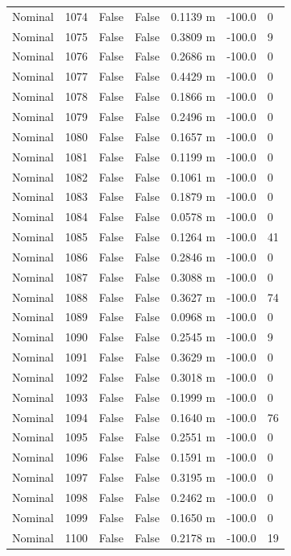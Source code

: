 \documentclass[11pt,a4paper,oneside]{book}
\begin{document}
\begin{longtable}{l l l l l l l}
Nominal & 1074 & False & False & 0.1139 m & -100.0 & 0 \\
Nominal & 1075 & False & False & 0.3809 m & -100.0 & 9 \\
Nominal & 1076 & False & False & 0.2686 m & -100.0 & 0 \\
Nominal & 1077 & False & False & 0.4429 m & -100.0 & 0 \\
Nominal & 1078 & False & False & 0.1866 m & -100.0 & 0 \\
Nominal & 1079 & False & False & 0.2496 m & -100.0 & 0 \\
Nominal & 1080 & False & False & 0.1657 m & -100.0 & 0 \\
Nominal & 1081 & False & False & 0.1199 m & -100.0 & 0 \\
Nominal & 1082 & False & False & 0.1061 m & -100.0 & 0 \\
Nominal & 1083 & False & False & 0.1879 m & -100.0 & 0 \\
Nominal & 1084 & False & False & 0.0578 m & -100.0 & 0 \\
Nominal & 1085 & False & False & 0.1264 m & -100.0 & 41 \\
Nominal & 1086 & False & False & 0.2846 m & -100.0 & 0 \\
Nominal & 1087 & False & False & 0.3088 m & -100.0 & 0 \\
Nominal & 1088 & False & False & 0.3627 m & -100.0 & 74 \\
Nominal & 1089 & False & False & 0.0968 m & -100.0 & 0 \\
Nominal & 1090 & False & False & 0.2545 m & -100.0 & 9 \\
Nominal & 1091 & False & False & 0.3629 m & -100.0 & 0 \\
Nominal & 1092 & False & False & 0.3018 m & -100.0 & 0 \\
Nominal & 1093 & False & False & 0.1999 m & -100.0 & 0 \\
Nominal & 1094 & False & False & 0.1640 m & -100.0 & 76 \\
Nominal & 1095 & False & False & 0.2551 m & -100.0 & 0 \\
Nominal & 1096 & False & False & 0.1591 m & -100.0 & 0 \\
Nominal & 1097 & False & False & 0.3195 m & -100.0 & 0 \\
Nominal & 1098 & False & False & 0.2462 m & -100.0 & 0 \\
Nominal & 1099 & False & False & 0.1650 m & -100.0 & 0 \\
Nominal & 1100 & False & False & 0.2178 m & -100.0 & 19 \\
\bottomrule \end{longtable}
\end{document}
